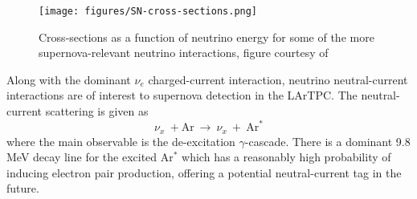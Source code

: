 \begin{figure}[h] %
   \centering
   \texttt{[image: figures/SN-cross-sections.png]} 
   \caption{Cross-sections as a function of neutrino energy for some of the more supernova-relevant neutrino interactions, figure courtesy of \cite{gil2003oscillation}}
   \label{fig:SN-cross-sections}
\end{figure}

\noindent Along with the dominant $\nu_{e}$ charged-current interaction, neutrino neutral-current interactions are of interest to supernova detection in the LArTPC.
The neutral-current scattering is given as
\begin{equation}
\nu_{x}\ + \textrm{Ar}\ \rightarrow\ \nu_{x}\ +\ \textrm{Ar}^{*}
\end{equation}
\noindent where the main observable is the de-excitation $\gamma$-cascade.
There is a dominant 9.8 MeV decay line for the excited Ar$^{*}$ which has a reasonably high probability of inducing electron pair production, offering a potential neutral-current tag in the future.






























